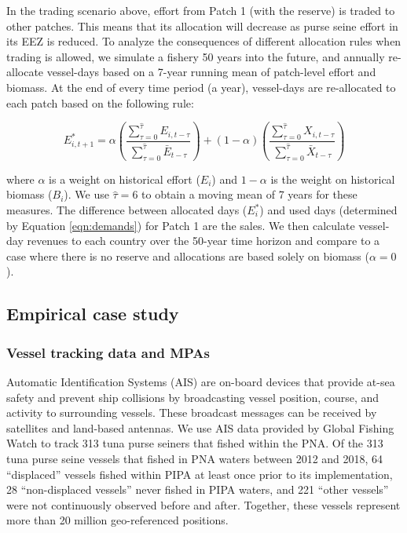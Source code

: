 \documentclass[12pt]{article}
\begin{document}
In the trading scenario above, effort from Patch 1 (with the reserve) is traded to other patches. This means that its allocation will decrease as purse seine effort in its EEZ is reduced. To analyze the consequences of different allocation rules when trading is allowed, we simulate a fishery 50 years into the future, and annually re-allocate vessel-days based on a 7-year running mean of patch-level effort and biomass. At the end of every time period (a year), vessel-days are re-allocated to each patch based on the following rule:

$$
E_{i,t+1}^* = \alpha
\left(\frac{\sum_{\tau = 0}^{\hat{\tau}}E_{i,t-\tau}}{\sum_{\tau = 0}^{\hat{\tau}}\bar{E}_{{t-\tau}}}
	\right)
	+
(1 - \alpha)
\left(\frac{\sum_{\tau = 0}^{\hat{\tau}}X_{i,t-\tau}}{\sum_{\tau = 0}^{\hat{\tau}}\bar{X}_{t-\tau}} \right)
$$

\noindent where $\alpha$ is a weight on historical effort ($E_i$) and $1-\alpha$ is the weight on historical biomass ($B_i$). We use $\hat{\tau}= 6$ to obtain a moving mean of 7 years for these measures. The difference between allocated days ($E_i^*$) and used days (determined by Equation \ref{eqn:demands}) for Patch 1 are the sales. We then calculate vessel-day revenues to each country over the 50-year time horizon and compare to a case where there is no reserve and allocations are based solely on biomass ($\alpha = 0$).

\subsection{Empirical case study}

\subsubsection{Vessel tracking data and MPAs}

Automatic Identification Systems (AIS) are on-board devices that provide at-sea safety and prevent ship collisions by broadcasting vessel position, course, and activity to surrounding vessels. These broadcast messages can be received by satellites and land-based antennas. We use AIS data provided by Global Fishing Watch \cite{kroodsma_2018} to track 313 tuna purse seiners that fished within the PNA. Of the 313 tuna purse seine vessels that fished in PNA waters between 2012 and 2018, 64 ``displaced'' vessels fished within PIPA at least once prior to its implementation, 28 ``non-displaced vessels'' never fished in PIPA waters, and  221 ``other vessels'' were not continuously observed before and after. Together, these vessels represent more than 20 million geo-referenced positions.
\end{document}
